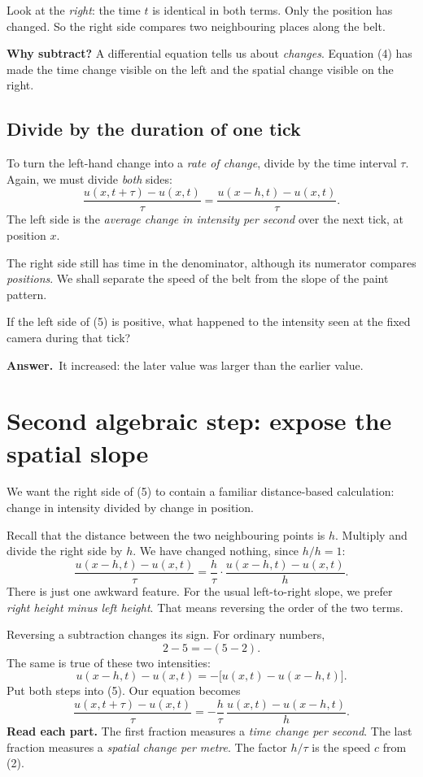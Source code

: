 \documentclass[11pt,a4paper]{article}
\newcommand{\secstart}[1]{\Needspace{7\baselineskip}\section{#1}}
\newcommand{\substart}[1]{\Needspace{5\baselineskip}\subsection{#1}}
\newcommand{\answer}{\par\smallskip\textbf{Answer.}~}
\begin{document}
Look at the \emph{right}: the time $t$ is identical in both terms. Only the position has changed. So the right side compares two neighbouring places along the belt.

\begin{pointbox}
\textbf{Why subtract?} A differential equation tells us about \emph{changes}. Equation (4) has made the time change visible on the left and the spatial change visible on the right.
\end{pointbox}
\substart{Divide by the duration of one tick}
To turn the left-hand change into a \emph{rate of change}, divide by the time interval $\tau$. Again, we must divide \emph{both} sides:
\begin{equation}
\boxed{\frac{u(x,t+\tau)-u(x,t)}{\tau}
=\frac{u(x-h,t)-u(x,t)}{\tau}.}\tag{5}
\end{equation}
The left side is the \emph{average change in intensity per second} over the next tick, at position $x$.

The right side still has time in the denominator, although its numerator compares \emph{positions}. We shall separate the speed of the belt from the slope of the paint pattern.

\begin{thinkbox}
If the left side of (5) is positive, what happened to the intensity seen at the fixed camera during that tick?
\answer It increased: the later value was larger than the earlier value.
\end{thinkbox}

\clearpage
\secstart{Second algebraic step: expose the spatial slope}
We want the right side of (5) to contain a familiar distance-based calculation: change in intensity divided by change in position.

Recall that the distance between the two neighbouring points is $h$. Multiply and divide the right side by $h$. We have changed nothing, since $h/h=1$:
\[
\frac{u(x-h,t)-u(x,t)}{\tau}
=\frac{h}{\tau}\cdot\frac{u(x-h,t)-u(x,t)}{h}.
\]
There is just one awkward feature. For the usual left-to-right slope, we prefer \emph{right height minus left height}. That means reversing the order of the two terms.

Reversing a subtraction changes its sign. For ordinary numbers,
\[
2-5=-(5-2).
\]
The same is true of these two intensities:
\[
u(x-h,t)-u(x,t)=-\bigl[u(x,t)-u(x-h,t)\bigr].
\]
Put both steps into (5). Our equation becomes
\begin{equation}
\boxed{\frac{u(x,t+\tau)-u(x,t)}{\tau}
=-\frac{h}{\tau}\,\frac{u(x,t)-u(x-h,t)}{h}.}\tag{6}
\end{equation}
\textbf{Read each part.} The first fraction measures a \emph{time change per second}. The last fraction measures a \emph{spatial change per metre}. The factor $h/\tau$ is the speed $c$ from (2).
\end{document}
